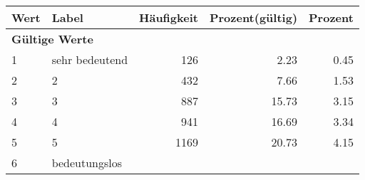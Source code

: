      \begin{longtable}{lXrrr}
     \toprule
     \textbf{Wert} & \textbf{Label} & \textbf{Häufigkeit} & \textbf{Prozent(gültig)} & \textbf{Prozent} \\
     \endhead
     \midrule
     \multicolumn{5}{l}{\textbf{Gültige Werte}}\\

     1 &
     \multicolumn{1}{X}{ sehr bedeutend   } &


       \num{126} &
       \num[round-mode=places,round-precision=2]{2,23} &
         \num[round-mode=places,round-precision=2]{0,45} \\

     2 &
     \multicolumn{1}{X}{ 2   } &


       \num{432} &
       \num[round-mode=places,round-precision=2]{7,66} &
         \num[round-mode=places,round-precision=2]{1,53} \\

     3 &
     \multicolumn{1}{X}{ 3   } &


       \num{887} &
       \num[round-mode=places,round-precision=2]{15,73} &
         \num[round-mode=places,round-precision=2]{3,15} \\

     4 &
     \multicolumn{1}{X}{ 4   } &


       \num{941} &
       \num[round-mode=places,round-precision=2]{16,69} &
         \num[round-mode=places,round-precision=2]{3,34} \\

     5 &
     \multicolumn{1}{X}{ 5   } &


       \num{1169} &
       \num[round-mode=places,round-precision=2]{20,73} &
         \num[round-mode=places,round-precision=2]{4,15} \\

     6 &
     \multicolumn{1}{X}{ bedeutungslos   } &



\end{longtable}
